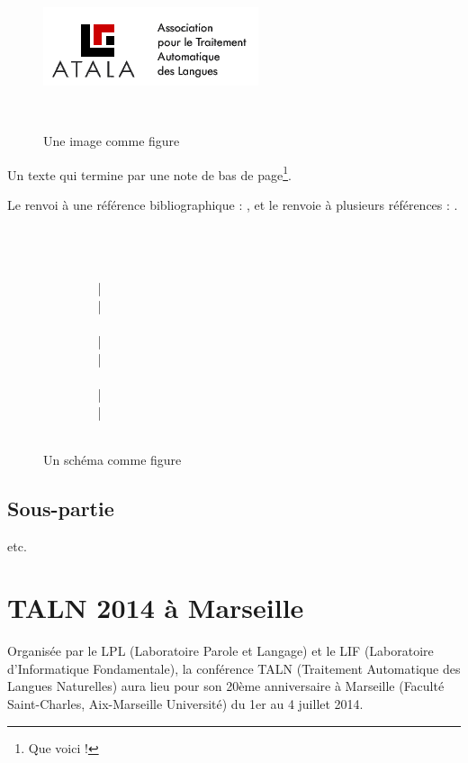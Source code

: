 \documentclass[10pt,a4paper,twoside]{article}
\begin{document}
\begin{figure}[htbp] 
\begin{center} 
\includegraphics{atala.png}
\end{center} 
\caption{Une image comme figure} \label{image} \
\end{figure}


Un texte qui termine par une note de bas de page\footnote{Que voici !}.

Le renvoi à une référence bibliographique : \cite{Bernhard07}, et le renvoie à plusieurs références : \cite{TALN2014,LanglaisPatry07}.

\begin{figure}[htbp] 
\begin{center} 
~\\
~\\
\\
 ~~~~~~~~ | \\
 ~~~~~~~~ | \\
\\
~~~~~~~~ | \\
~~~~~~~~ | \\
\\
~~~~~~~~ | \\
~~~~~~~~ | \\
\\

\end{center} 
\caption{Un schéma comme figure} \label{schema}
\end{figure}



\subsection{Sous-partie}

etc.


\section{TALN 2014 à Marseille}

Organisée par le LPL (Laboratoire Parole et Langage) et le LIF (Laboratoire d’Informatique Fondamentale), la conférence TALN (Traitement Automatique des Langues Naturelles) aura lieu pour son 20ème anniversaire à Marseille (Faculté Saint-Charles, Aix-Marseille Université) du 1er au 4 juillet 2014.
\end{document}
